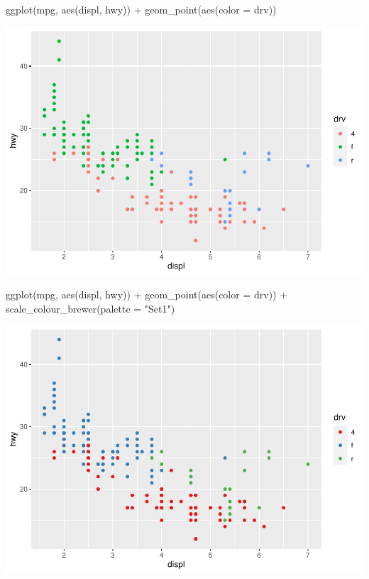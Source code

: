 \documentclass[
]{article}
\newenvironment{Shaded}{\begin{snugshade}}{\end{snugshade}}
\newcommand{\AttributeTok}[1]{\textcolor[rgb]{0.77,0.63,0.00}{#1}}
\newcommand{\FunctionTok}[1]{\textcolor[rgb]{0.00,0.00,0.00}{#1}}
\newcommand{\NormalTok}[1]{#1}
\newcommand{\SpecialCharTok}[1]{\textcolor[rgb]{0.00,0.00,0.00}{#1}}
\newcommand{\StringTok}[1]{\textcolor[rgb]{0.31,0.60,0.02}{#1}}
\begin{document}
\begin{Shaded}
\begin{Highlighting}[]
\FunctionTok{ggplot}\NormalTok{(mpg, }\FunctionTok{aes}\NormalTok{(displ, hwy)) }\SpecialCharTok{+}
  \FunctionTok{geom\_point}\NormalTok{(}\FunctionTok{aes}\NormalTok{(}\AttributeTok{color =}\NormalTok{ drv))}
\end{Highlighting}
\end{Shaded}

\includegraphics{Journal_files/figure-latex/unnamed-chunk-59-1.pdf}

\begin{Shaded}
\begin{Highlighting}[]
\FunctionTok{ggplot}\NormalTok{(mpg, }\FunctionTok{aes}\NormalTok{(displ, hwy)) }\SpecialCharTok{+}
  \FunctionTok{geom\_point}\NormalTok{(}\FunctionTok{aes}\NormalTok{(}\AttributeTok{color =}\NormalTok{ drv)) }\SpecialCharTok{+}
  \FunctionTok{scale\_colour\_brewer}\NormalTok{(}\AttributeTok{palette =} \StringTok{"Set1"}\NormalTok{)}
\end{Highlighting}
\end{Shaded}

\includegraphics{Journal_files/figure-latex/unnamed-chunk-59-2.pdf}
\end{document}
